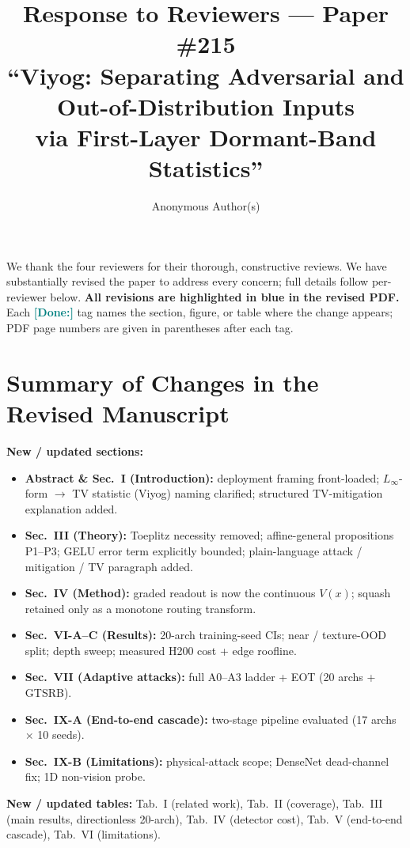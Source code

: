 \documentclass[10pt,letterpaper,journal]{IEEEtran}
\title{Response to Reviewers --- Paper \#215\\
``Viyog: Separating Adversarial and Out-of-Distribution Inputs\\
via First-Layer Dormant-Band Statistics''}
\author{Anonymous Author(s)}
\begin{document}
\maketitle

\noindent We thank the four reviewers for their thorough, constructive reviews.
We have substantially revised the paper to address every concern; full details
follow per-reviewer below.
\textbf{All revisions are highlighted in blue in the revised PDF.}
Each \textcolor{teal}{\textbf{[Done:]}} tag names the section, figure, or table
where the change appears; PDF page numbers are given in parentheses after each tag.

\section*{Summary of Changes in the Revised Manuscript}

\noindent\textbf{New / updated sections:}
\begin{itemize}[leftmargin=1.4em,nosep,topsep=2pt]
  \item \textbf{Abstract \& Sec.~I (Introduction):} deployment framing front-loaded; $L_\infty$-form $\to$ TV statistic (Viyog) naming clarified; structured TV-mitigation explanation added.
  \item \textbf{Sec.~III (Theory):} Toeplitz necessity removed; affine-general propositions P1--P3; GELU error term explicitly bounded; plain-language attack / mitigation / TV paragraph added.
  \item \textbf{Sec.~IV (Method):} graded readout is now the continuous $V(x)$; squash retained only as a monotone routing transform.
  \item \textbf{Sec.~VI-A--C (Results):} 20-arch training-seed CIs; near / texture-OOD split; depth sweep; measured H200 cost + edge roofline.
  \item \textbf{Sec.~VII (Adaptive attacks):} full A0--A3 ladder + EOT (20 archs + GTSRB).
  \item \textbf{Sec.~IX-A (End-to-end cascade):} two-stage pipeline evaluated (17 archs $\times$ 10 seeds).
  \item \textbf{Sec.~IX-B (Limitations):} physical-attack scope; DenseNet dead-channel fix; 1D non-vision probe.
\end{itemize}

\smallskip
\noindent\textbf{New / updated tables:}
Tab.~I (related work), Tab.~II (coverage), Tab.~III (main results, directionless 20-arch),
Tab.~IV (detector cost), Tab.~V (end-to-end cascade), Tab.~VI (limitations).
\end{document}
